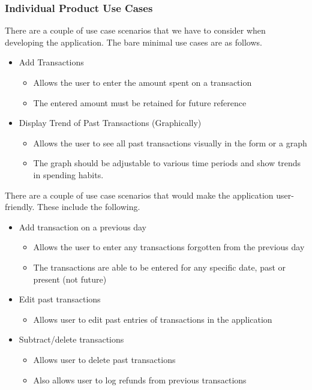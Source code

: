 \documentclass[12pt, titlepage]{article}
\begin{document}
\subsubsection{Individual Product Use Cases}
There are a couple of use case scenarios that we have to consider when developing the application. The bare minimal use cases are as follows.
\begin{itemize}
   \item Add Transactions
   \begin{itemize}
     \item Allows the user to enter the amount spent on a transaction
     \item The entered amount must be retained for future reference
   \end{itemize}
   \item Display Trend of Past Transactions (Graphically)
   \begin{itemize}
     \item Allows the user to see all past transactions visually in the form or a graph
     \item The graph should be adjustable to various time periods and show trends in spending habits.
   \end{itemize}
\end{itemize}

There are a couple of use case scenarios that would make the application user-friendly. These include the following. %
\begin{itemize}
   \item Add transaction on a previous day
   \begin{itemize}
     \item Allows the user to enter any transactions forgotten from the previous day
     \item The transactions are able to be entered for any specific date, past or present (not future)
   \end{itemize}
   \item Edit past transactions
   \begin{itemize}
     \item Allows user to edit past entries of transactions in the application
   \end{itemize}
   \item Subtract/delete transactions
   \begin{itemize}
     \item Allows user to delete past transactions
    \item Also allows user to log refunds from previous transactions
   \end{itemize}
\end{itemize}
\end{document}
